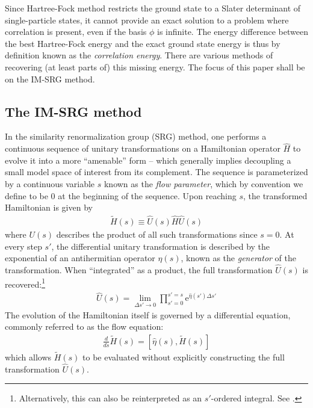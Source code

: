 \documentclass[amsmath, amssymb, aps, floatfix, nofootinbib, preprintnumbers,showpacs, superscriptaddress, twocolumn]{revtex4-1}
\begin{document}
Since Hartree-Fock method restricts the ground state to a Slater determinant
of single-particle states, it cannot provide an exact solution to a problem
where correlation is present, even if the basis $\phi$ is infinite.  The
energy difference between the best Hartree-Fock energy and the exact ground
state energy is thus by definition known as the \textit{correlation energy}.
There are various methods of recovering (at least parts of) this missing
energy.  The focus of this paper shall be on the IM-SRG method.

\subsection{The IM-SRG method}
\label{subsec:imsrgmethod}

In the similarity renormalization group (SRG) method, one performs a
continuous sequence of unitary transformations on a Hamiltonian operator
$\hat H$ to evolve it into a more ``amenable'' form -- which generally implies
decoupling a small model space of interest from its complement.  The sequence
is parameterized by a continuous variable $s$ known as the \textit{flow
  parameter}, which by convention we define to be $0$ at the beginning of the
sequence.  Upon reaching $s$, the transformed Hamiltonian is given by
\begin{align*}
  \tilde H(s) \equiv \hat U(s) \hat H \hat U(s)
\end{align*}
where $U(s)$ describes the product of all such transformations since $s = 0$.
At every step $s'$, the differential unitary transformation is described by
the exponential of an antihermitian operator $\eta(s)$, known as the
\textit{generator} of the transformation.  When ``integrated'' as a product,
the full transformation $\hat U(s)$ is recovered:\footnote{Alternatively, this
  can also be reinterpreted as an $s'$-ordered integral.  See \cite[\S
  6.1]{reimann2013quantum}.}
\begin{align*}
  \hat U(s) = \lim_{\Delta s' \to 0} \prod_{s' = 0}^{s' = s}
  \mathrm e^{\hat \eta(s') \Delta s'}
\end{align*}
The evolution of the Hamiltonian itself is governed by a differential
equation, commonly referred to as the flow equation:
\begin{gather} \label{eq:imsrgode}
  \frac{d}{d s} \tilde H(s) = [\hat \eta(s), \tilde H(s)]
\end{gather}
which allows $\tilde H(s)$ to be evaluated without explicitly constructing the
full transformation $\hat U(s)$.
\end{document}
